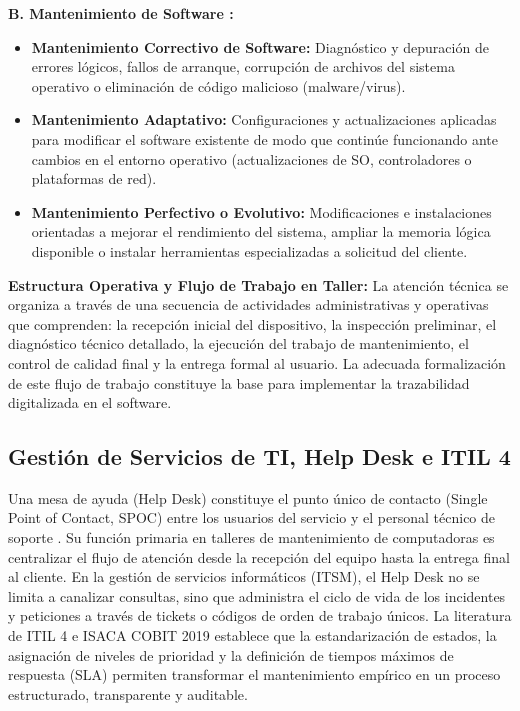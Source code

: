 \textbf{B. Mantenimiento de Software \cite{iso14764, pressman2021}:}
\begin{itemize}
    \item \textbf{Mantenimiento Correctivo de Software:} Diagnóstico y depuración de errores lógicos, fallos de arranque, corrupción de archivos del sistema operativo o eliminación de código malicioso (malware/virus).
    \item \textbf{Mantenimiento Adaptativo:} Configuraciones y actualizaciones aplicadas para modificar el software existente de modo que continúe funcionando ante cambios en el entorno operativo (actualizaciones de SO, controladores o plataformas de red).
    \item \textbf{Mantenimiento Perfectivo o Evolutivo:} Modificaciones e instalaciones orientadas a mejorar el rendimiento del sistema, ampliar la memoria lógica disponible o instalar herramientas especializadas a solicitud del cliente.
\end{itemize}

\textbf{Estructura Operativa y Flujo de Trabajo en Taller:} La atención técnica se organiza a través de una secuencia de actividades administrativas y operativas que comprenden: la recepción inicial del dispositivo, la inspección preliminar, el diagnóstico técnico detallado, la ejecución del trabajo de mantenimiento, el control de calidad final y la entrega formal al usuario. La adecuada formalización de este flujo de trabajo constituye la base para implementar la trazabilidad digitalizada en el software.

\subsection{Gestión de Servicios de TI, Help Desk e ITIL 4}

Una mesa de ayuda (Help Desk) constituye el punto único de contacto (Single Point of Contact, SPOC) entre los usuarios del servicio y el personal técnico de soporte \cite{axelos2019}. Su función primaria en talleres de mantenimiento de computadoras es centralizar el flujo de atención desde la recepción del equipo hasta la entrega final al cliente. En la gestión de servicios informáticos (ITSM), el Help Desk no se limita a canalizar consultas, sino que administra el ciclo de vida de los incidentes y peticiones a través de tickets o códigos de orden de trabajo únicos. La literatura de ITIL 4 \cite{axelos2019} e ISACA COBIT 2019 \cite{isaca2019} establece que la estandarización de estados, la asignación de niveles de prioridad y la definición de tiempos máximos de respuesta (SLA) permiten transformar el mantenimiento empírico en un proceso estructurado, transparente y auditable.

